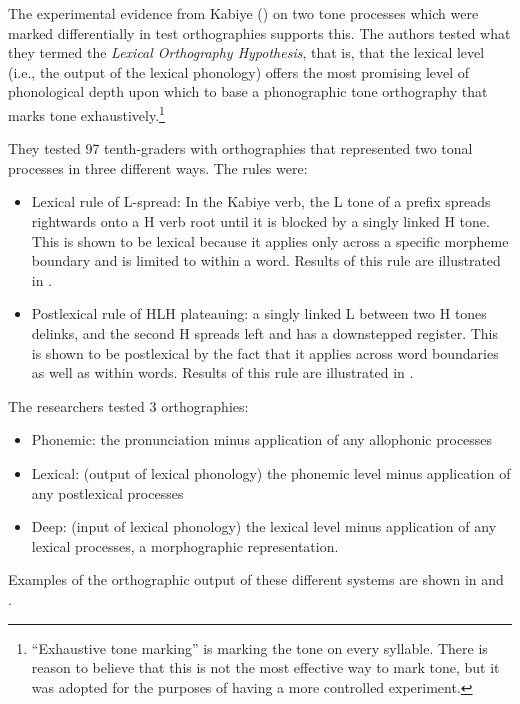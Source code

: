 \documentclass[output=paper]{langscibook}
\begin{document}
The experimental evidence from Kabiye (\citealt{Roberts2016neither}) on two tone processes which were marked differentially in test orthographies supports this. The authors tested what they termed the \textit{Lexical Orthography Hypothesis}, that is, that the lexical level (i.e., the output of the lexical phonology) offers the most promising level of phonological depth upon which to base a phonographic tone orthography that marks tone exhaustively.\footnote{“Exhaustive tone marking” is marking the tone on every syllable. There is reason to believe that this is not the most effective way to mark tone, but it was adopted for the purposes of having a more controlled experiment.}

They tested 97 tenth-graders with orthographies that represented two tonal processes in three different ways. The rules were:

\begin{itemize}
    \item Lexical rule of L-spread: In the Kabiye verb, the L tone of a prefix spreads rightwards onto a H verb root until it is blocked by a singly linked H tone. This is shown to be lexical because it applies only across a specific morpheme boundary and is limited to within a word. Results of this rule are illustrated in .
    \item Postlexical rule of HLH plateauing: a singly linked L between two H tones delinks, and the second H spreads left and has a downstepped register. This is shown to be postlexical by the fact that it applies across word boundaries as well as within words. Results of this rule are illustrated in .
\end{itemize}

The researchers tested 3 orthographies:

\begin{itemize}
    \item Phonemic: the pronunciation minus application of any allophonic processes
    \item Lexical: (output of lexical phonology) the phonemic level minus application of any postlexical processes
    \item Deep: (input of lexical phonology) the lexical level minus application of any lexical processes, a morphographic representation.
\end{itemize}

Examples of the orthographic output of these different systems are shown in  and . 
\end{document}

